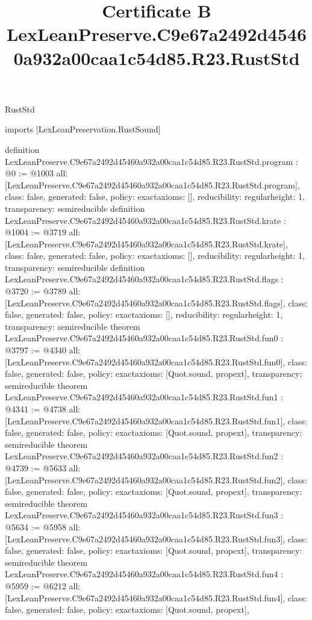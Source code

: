 \begin{lexlean}{RustStd}
\title{Certificate B LexLeanPreserve.C9e67a2492d45460a932a00caa1c54d85.R23.RustStd}
\begin{coremodule}
imports [LexLeanPreservation.RustSound]

definition LexLeanPreserve.C9e67a2492d45460a932a00caa1c54d85.R23.RustStd.program : @0 := @1003 {
  all: [LexLeanPreserve.C9e67a2492d45460a932a00caa1c54d85.R23.RustStd.program],
  class: false,
  generated: false,
  policy: exact{axioms: []},
  reducibility: regular{height: 1},
  transparency: semireducible
}
definition LexLeanPreserve.C9e67a2492d45460a932a00caa1c54d85.R23.RustStd.krate : @1004 := @3719 {
  all: [LexLeanPreserve.C9e67a2492d45460a932a00caa1c54d85.R23.RustStd.krate],
  class: false,
  generated: false,
  policy: exact{axioms: []},
  reducibility: regular{height: 1},
  transparency: semireducible
}
definition LexLeanPreserve.C9e67a2492d45460a932a00caa1c54d85.R23.RustStd.flags : @3720 := @3789 {
  all: [LexLeanPreserve.C9e67a2492d45460a932a00caa1c54d85.R23.RustStd.flags],
  class: false,
  generated: false,
  policy: exact{axioms: []},
  reducibility: regular{height: 1},
  transparency: semireducible
}
theorem LexLeanPreserve.C9e67a2492d45460a932a00caa1c54d85.R23.RustStd.fun0 : @3797 := @4340 {
  all: [LexLeanPreserve.C9e67a2492d45460a932a00caa1c54d85.R23.RustStd.fun0],
  class: false,
  generated: false,
  policy: exact{axioms: [Quot.sound, propext]},
  transparency: semireducible
}
theorem LexLeanPreserve.C9e67a2492d45460a932a00caa1c54d85.R23.RustStd.fun1 : @4341 := @4738 {
  all: [LexLeanPreserve.C9e67a2492d45460a932a00caa1c54d85.R23.RustStd.fun1],
  class: false,
  generated: false,
  policy: exact{axioms: [Quot.sound, propext]},
  transparency: semireducible
}
theorem LexLeanPreserve.C9e67a2492d45460a932a00caa1c54d85.R23.RustStd.fun2 : @4739 := @5633 {
  all: [LexLeanPreserve.C9e67a2492d45460a932a00caa1c54d85.R23.RustStd.fun2],
  class: false,
  generated: false,
  policy: exact{axioms: [Quot.sound, propext]},
  transparency: semireducible
}
theorem LexLeanPreserve.C9e67a2492d45460a932a00caa1c54d85.R23.RustStd.fun3 : @5634 := @5958 {
  all: [LexLeanPreserve.C9e67a2492d45460a932a00caa1c54d85.R23.RustStd.fun3],
  class: false,
  generated: false,
  policy: exact{axioms: [Quot.sound, propext]},
  transparency: semireducible
}
theorem LexLeanPreserve.C9e67a2492d45460a932a00caa1c54d85.R23.RustStd.fun4 : @5959 := @6212 {
  all: [LexLeanPreserve.C9e67a2492d45460a932a00caa1c54d85.R23.RustStd.fun4],
  class: false,
  generated: false,
  policy: exact{axioms: [Quot.sound, propext]},
}
\end{coremodule}
\end{lexlean}
